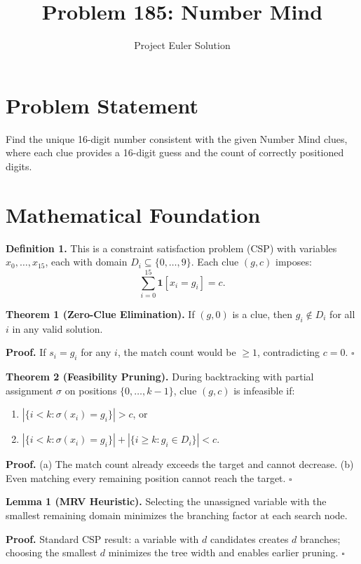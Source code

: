 \documentclass[12pt]{article}
\title{Problem 185: Number Mind}
\author{Project Euler Solution}
\date{}
\begin{document}
\maketitle

\section{Problem Statement}
Find the unique 16-digit number consistent with the given Number Mind clues, where each clue provides a 16-digit guess and the count of correctly positioned digits.

\section{Mathematical Foundation}

\textbf{Definition 1.} This is a constraint satisfaction problem (CSP) with variables $x_0, \ldots, x_{15}$, each with domain $D_i \subseteq \{0,\ldots,9\}$. Each clue $(g, c)$ imposes:
\[
\sum_{i=0}^{15} \mathbf{1}[x_i = g_i] = c.
\]

\textbf{Theorem 1 (Zero-Clue Elimination).} If $(g, 0)$ is a clue, then $g_i \notin D_i$ for all $i$ in any valid solution.

\textbf{Proof.} If $s_i = g_i$ for any $i$, the match count would be $\geq 1$, contradicting $c = 0$. $\square$

\medskip

\textbf{Theorem 2 (Feasibility Pruning).} During backtracking with partial assignment $\sigma$ on positions $\{0, \ldots, k-1\}$, clue $(g, c)$ is infeasible if:
\begin{enumerate}
    \item[(a)] $|\{i < k : \sigma(x_i) = g_i\}| > c$, or
    \item[(b)] $|\{i < k : \sigma(x_i) = g_i\}| + |\{i \geq k : g_i \in D_i\}| < c$.
\end{enumerate}

\textbf{Proof.} (a) The match count already exceeds the target and cannot decrease. (b) Even matching every remaining position cannot reach the target. $\square$

\medskip

\textbf{Lemma 1 (MRV Heuristic).} Selecting the unassigned variable with the smallest remaining domain minimizes the branching factor at each search node.

\textbf{Proof.} Standard CSP result: a variable with $d$ candidates creates $d$ branches; choosing the smallest $d$ minimizes the tree width and enables earlier pruning. $\square$
\end{document}
